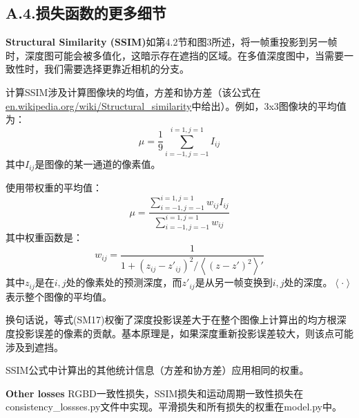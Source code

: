\documentclass[10pt,journal,compsoc,UTF8]{IEEEtran}
\begin{document}
\subsection*{A.4.损失函数的更多细节}
\textbf{Structural Similarity (SSIM)}如第4.2节和图3所述，将一帧重投影到另一帧时，深度图可能会被多值化，这暗示存在遮挡的区域。在多值深度图中，当需要一致性时，我们需要选择更靠近相机的分支。

计算SSIM涉及计算图像块的均值，方差和协方差（该公式在\url{en.wikipedia.org/wiki/Structural_similarity}中给出）。例如，3x3图像块的平均值为：
\begin{equation}
  \mu=\frac{1}{9}\sum_{i=-1,j=-1}^{i=1,j=1}I_{ij}
  \tag{SM16}
\end{equation}
其中$I_{ij}$是图像的某一通道的像素值。

使用带权重的平均值：
\begin{equation}
  \mu=\frac{\sum_{i=-1,j=-1}^{i=1,j=1}w_{ij}I_{ij}}
  {\sum_{i=-1,j=-1}^{i=1,j=1}w_{ij}}
  \tag{SM17}
\end{equation}
其中权重函数是：
\begin{equation}
  w_{ij}=\frac{1}{1+(z_{ij}-z'_{ij})^2/\left \langle (z-z')^2 \right \rangle'}
  \tag{SM18}
\end{equation}
其中$z_{ij}$是在$i,j$处的像素处的预测深度，而$z'_{ij}$是从另一帧变换到$i,j$处的深度。$\left \langle \cdot  \right \rangle$表示整个图像的平均值。

换句话说，等式(SM17)权衡了深度投影误差大于在整个图像上计算出的均方根深度投影误差的像素的贡献。基本原理是，如果深度重新投影误差较大，则该点可能涉及到遮挡。

SSIM公式中计算出的其他统计信息（方差和协方差）应用相同的权重。

\textbf{Other losses}
RGBD一致性损失，SSIM损失和运动周期一致性损失在consistency\_lossses.py文件中实现。平滑损失和所有损失的权重在model.py中。
\end{document}
